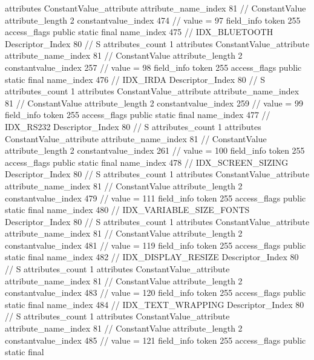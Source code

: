 {{{{{				attributes {
				ConstantValue_attribute {
					attribute_name_index	81		// ConstantValue
					attribute_length	2
					constantvalue_index	474		// value = 97
				}
				}
			}
			field_info {
				token	255
				access_flags	public static final
				name_index	475		// IDX_BLUETOOTH
				Descriptor_Index	80		// S
				attributes_count	1
				attributes {
				ConstantValue_attribute {
					attribute_name_index	81		// ConstantValue
					attribute_length	2
					constantvalue_index	257		// value = 98
				}
				}
			}
			field_info {
				token	255
				access_flags	public static final
				name_index	476		// IDX_IRDA
				Descriptor_Index	80		// S
				attributes_count	1
				attributes {
				ConstantValue_attribute {
					attribute_name_index	81		// ConstantValue
					attribute_length	2
					constantvalue_index	259		// value = 99
				}
				}
			}
			field_info {
				token	255
				access_flags	public static final
				name_index	477		// IDX_RS232
				Descriptor_Index	80		// S
				attributes_count	1
				attributes {
				ConstantValue_attribute {
					attribute_name_index	81		// ConstantValue
					attribute_length	2
					constantvalue_index	261		// value = 100
				}
				}
			}
			field_info {
				token	255
				access_flags	public static final
				name_index	478		// IDX_SCREEN_SIZING
				Descriptor_Index	80		// S
				attributes_count	1
				attributes {
				ConstantValue_attribute {
					attribute_name_index	81		// ConstantValue
					attribute_length	2
					constantvalue_index	479		// value = 111
				}
				}
			}
			field_info {
				token	255
				access_flags	public static final
				name_index	480		// IDX_VARIABLE_SIZE_FONTS
				Descriptor_Index	80		// S
				attributes_count	1
				attributes {
				ConstantValue_attribute {
					attribute_name_index	81		// ConstantValue
					attribute_length	2
					constantvalue_index	481		// value = 119
				}
				}
			}
			field_info {
				token	255
				access_flags	public static final
				name_index	482		// IDX_DISPLAY_RESIZE
				Descriptor_Index	80		// S
				attributes_count	1
				attributes {
				ConstantValue_attribute {
					attribute_name_index	81		// ConstantValue
					attribute_length	2
					constantvalue_index	483		// value = 120
				}
				}
			}
			field_info {
				token	255
				access_flags	public static final
				name_index	484		// IDX_TEXT_WRAPPING
				Descriptor_Index	80		// S
				attributes_count	1
				attributes {
				ConstantValue_attribute {
					attribute_name_index	81		// ConstantValue
					attribute_length	2
					constantvalue_index	485		// value = 121
				}
				}
			}
			field_info {
				token	255
				access_flags	public static final
}}}}}
